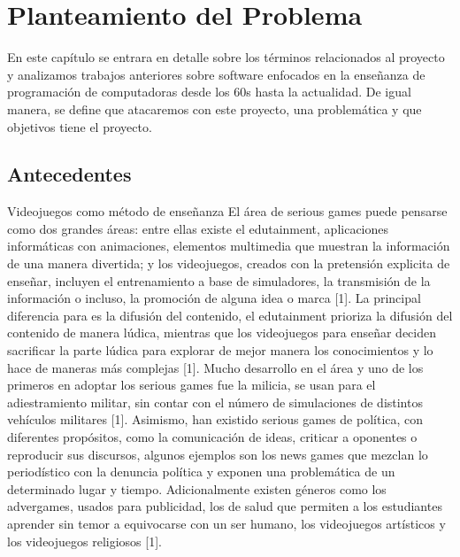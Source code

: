 \chapter{Planteamiento del Problema}
En este capítulo se entrara en detalle sobre los términos relacionados al proyecto y analizamos 
trabajos anteriores sobre software enfocados en la enseñanza de programación de computadoras desde los 
60s hasta la actualidad. De igual manera, se define que atacaremos con este proyecto, una problemática y que objetivos tiene el proyecto.

\section{Antecedentes}

Videojuegos como método de enseñanza
El área de serious games puede pensarse como dos grandes áreas: entre ellas existe el edutainment, 
aplicaciones informáticas con animaciones, elementos multimedia que muestran la información de una manera divertida; 
y los videojuegos, creados con la pretensión explicita de enseñar, incluyen el entrenamiento a base de simuladores, 
la transmisión de la información o incluso, la promoción de alguna idea o marca [1]. 
La principal diferencia para es la difusión del contenido, el edutainment prioriza 
la difusión del contenido de manera lúdica, mientras que los videojuegos para enseñar deciden 
sacrificar la parte lúdica para explorar de mejor manera los conocimientos y lo hace de maneras más complejas [1].
Mucho desarrollo en el área y uno de los primeros en adoptar los serious games fue la milicia, 
se usan para el adiestramiento militar, sin contar con el número de simulaciones de distintos vehículos militares [1]. 
Asimismo, han existido serious games de política, con diferentes propósitos, como la comunicación de ideas, 
criticar a oponentes o reproducir sus discursos, 
algunos ejemplos son los news games que mezclan lo periodístico con la denuncia política y exponen una problemática de un determinado lugar y tiempo. 
Adicionalmente existen géneros como los advergames, usados para publicidad, 
los de salud que permiten a los estudiantes aprender sin temor a equivocarse con un ser humano, 
los videojuegos artísticos y los videojuegos religiosos [1].

